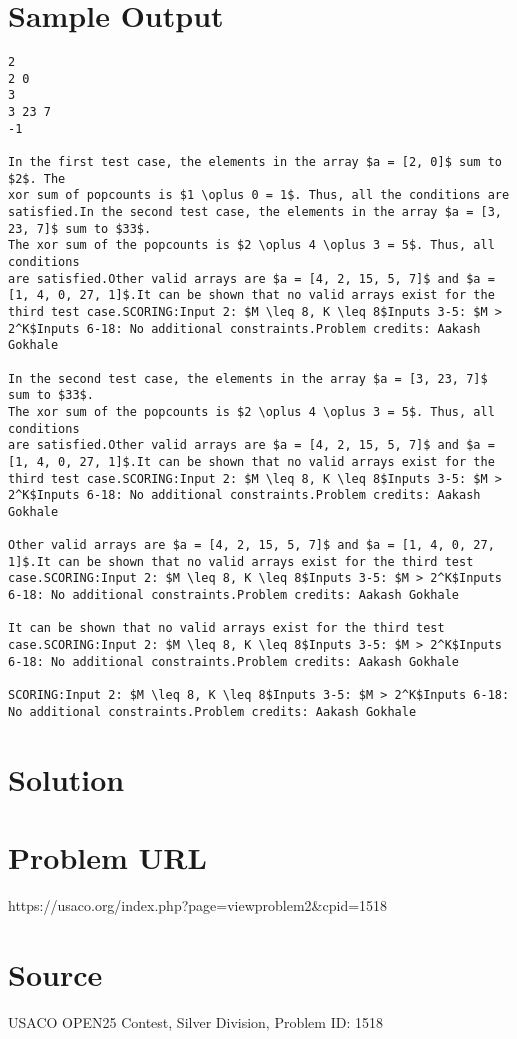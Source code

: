 \documentclass[12pt]{article}
\begin{document}
\section*{Sample Output}
\begin{verbatim}
2
2 0
3
3 23 7 
-1

In the first test case, the elements in the array $a = [2, 0]$ sum to $2$. The
xor sum of popcounts is $1 \oplus 0 = 1$. Thus, all the conditions are
satisfied.In the second test case, the elements in the array $a = [3, 23, 7]$ sum to $33$.
The xor sum of the popcounts is $2 \oplus 4 \oplus 3 = 5$. Thus, all conditions
are satisfied.Other valid arrays are $a = [4, 2, 15, 5, 7]$ and $a = [1, 4, 0, 27, 1]$.It can be shown that no valid arrays exist for the third test case.SCORING:Input 2: $M \leq 8, K \leq 8$Inputs 3-5: $M > 2^K$Inputs 6-18: No additional constraints.Problem credits: Aakash Gokhale

In the second test case, the elements in the array $a = [3, 23, 7]$ sum to $33$.
The xor sum of the popcounts is $2 \oplus 4 \oplus 3 = 5$. Thus, all conditions
are satisfied.Other valid arrays are $a = [4, 2, 15, 5, 7]$ and $a = [1, 4, 0, 27, 1]$.It can be shown that no valid arrays exist for the third test case.SCORING:Input 2: $M \leq 8, K \leq 8$Inputs 3-5: $M > 2^K$Inputs 6-18: No additional constraints.Problem credits: Aakash Gokhale

Other valid arrays are $a = [4, 2, 15, 5, 7]$ and $a = [1, 4, 0, 27, 1]$.It can be shown that no valid arrays exist for the third test case.SCORING:Input 2: $M \leq 8, K \leq 8$Inputs 3-5: $M > 2^K$Inputs 6-18: No additional constraints.Problem credits: Aakash Gokhale

It can be shown that no valid arrays exist for the third test case.SCORING:Input 2: $M \leq 8, K \leq 8$Inputs 3-5: $M > 2^K$Inputs 6-18: No additional constraints.Problem credits: Aakash Gokhale

SCORING:Input 2: $M \leq 8, K \leq 8$Inputs 3-5: $M > 2^K$Inputs 6-18: No additional constraints.Problem credits: Aakash Gokhale
\end{verbatim}

\section*{Solution}


\section*{Problem URL}
https://usaco.org/index.php?page=viewproblem2&cpid=1518

\section*{Source}
USACO OPEN25 Contest, Silver Division, Problem ID: 1518
\end{document}
